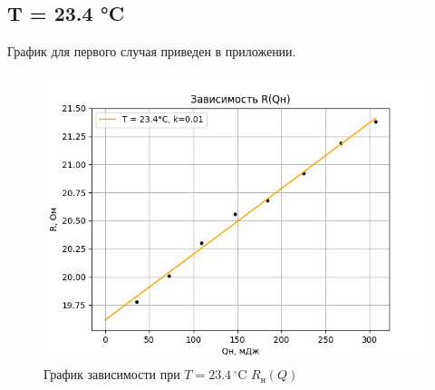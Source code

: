 \documentclass[a4paper, 10pt, twocolumn]{article}
\begin{document}
    \subsection{T = 23.4 °C}
    График для первого случая приведен в приложении.
    \begin{figure}[H]
        \centering
        \includegraphics[width=1\linewidth]{graphs/figure1.png}
        \begin{center}
            \caption{График зависимости при $T =23.4 \, ^\circ\text{C}$ $R_\text{н}(Q)$}
        \end{center}
    \end{figure}
\end{document}
